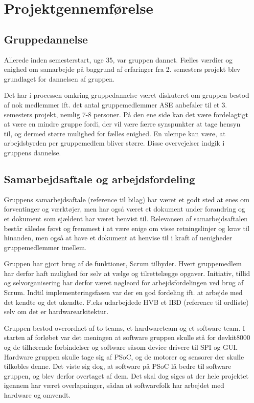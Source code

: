 \chapter{Projektgennemførelse}
\section{Gruppedannelse}
Allerede inden semesterstart, uge 35, var gruppen dannet. Fælles værdier og enighed om samarbejde på baggrund af erfaringer fra 2. semesters projekt
blev grundlaget for dannelsen af gruppen.

Det har i processen omkring gruppedannelse været diskuteret om gruppen bestod af nok medlemmer ift. det antal gruppemedlemmer ASE anbefaler til et 3. semesters
projekt, nemlig 7-8 personer. På den ene side kan det være fordelagtigt at være en mindre gruppe fordi, der vil være færre synspunkter at tage hensyn til,
og dermed større mulighed for fælles enighed. En ulempe kan være, at arbejdsbyrden per gruppemedlem bliver større. Disse overvejelser indgik i gruppens dannelse.\\

\section{Samarbejdsaftale og arbejdsfordeling}
Gruppens samarbejdsaftale (reference til bilag) har været et godt sted at enes om forventinger og værktøjer, men har også været et dokument under forandring
og et dokument som sjældent har været henvist til. 
Relevansen af samarbejdsaftalen består således først og fremmest i at være enige om visse retningslinjer og krav til hinanden, men også at have et dokument
at henvise til i kraft af uenigheder gruppemedlemmer imellem.

Gruppen har gjort brug af de funktioner, Scrum tilbyder. Hvert gruppemedlem har derfor haft mulighed for selv at vælge og tilrettelægge opgaver. Initiativ,
tillid og selvorganisering har derfor været nøgleord for arbejdsfordelingen ved brug af Scrum.
Indtil implementeringsfasen var der en god fordeling ift. at arbejde med det kendte og det ukendte. F.eks udarbejdede HVB et IBD (reference til ordliste)
selv om det er hardwarearkitektur.

Gruppen bestod overordnet af to teams, et hardwareteam og et software team. I starten af forløbet var det meningen at software gruppen skulle stå for devkit8000
og de tilhørende forbindelser og software såsom device drivere til SPI og GUI. 
Hardware gruppen skulle tage sig af PSoC, og de motorer og sensorer der skulle tilkobles denne. Det viste sig dog, at software på PSoC lå bedre til software gruppen,
og blev derfor overtaget af dem. Det skal dog siges at der hele projektet igennem har været overlapninger, sådan at softwarefolk har arbejdet med hardware og omvendt.

